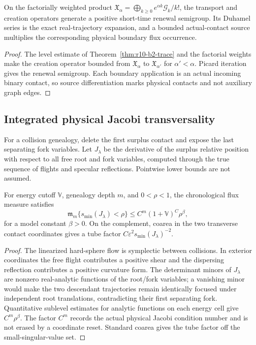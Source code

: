 \begin{proposition}
\label{prop:r10-b2-renewal}
On the factorially weighted product
\(\mathfrak X_\alpha=\bigoplus_{k\ge0}e^{\alpha k}\mathcal G_k/k!\), the
transport and creation operators generate a positive short-time renewal
semigroup.  Its Duhamel series is the exact real-trajectory expansion, and a
bounded actual-contact source multiplies the corresponding physical boundary
flux occurrence.
\end{proposition}

\begin{proof}
The level estimate of Theorem~\ref{thm:r10-b2-trace} and the factorial weights
make the creation operator bounded from \(\mathfrak X_\alpha\) to
\(\mathfrak X_{\alpha'}\) for \(\alpha'<\alpha\).  Picard iteration gives the
renewal semigroup.  Each boundary application is an actual incoming binary
contact, so source differentiation marks physical contacts and not auxiliary
graph edges.
\end{proof}

\subsection{Integrated physical Jacobi transversality}

For a collision genealogy, delete the first surplus contact and expose the
last separating fork variables.  Let \(J_\lambda\) be the derivative of the
surplus relative position with respect to all free root and fork variables,
computed through the true sequence of flights and specular reflections.
Pointwise lower bounds are not assumed.

\begin{lemma}
\label{lem:r10-b2-jacobi}
For energy cutoff \(\mathbb V\), genealogy depth \(m\), and
\(0<\rho<1\), the chronological flux measure satisfies
\[
 \mathfrak m_m\{s_{\min}(J_\lambda)<\rho\}
 \le C^m(1+\mathbb V)^C\rho^\beta,
\]
for a model constant \(\beta>0\).  On the complement, coarea in the two
transverse contact coordinates gives a tube factor
\(C\varepsilon^2s_{\min}(J_\lambda)^{-2}\).
\end{lemma}

\begin{proof}
The linearized hard-sphere flow is symplectic between collisions.  In exterior
coordinates the free flight contributes a positive shear and the dispersing
reflection contributes a positive curvature form.  The determinant minors of
\(J_\lambda\) are nonzero real-analytic functions of the root/fork variables;
a vanishing minor would make the two descendant trajectories remain
identically focused under independent root translations, contradicting their
first separating fork.  Quantitative sublevel estimates for analytic functions
on each energy cell give \(C^m\rho^\beta\).  The factor \(C^m\) records the
actual physical Jacobi condition number and is not erased by a coordinate
reset.  Standard coarea gives the tube factor off the small-singular-value set.
\end{proof}

